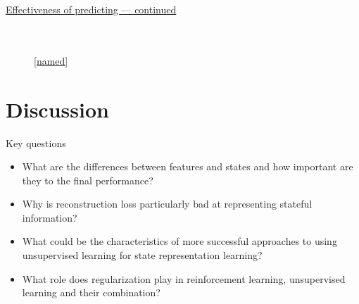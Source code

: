\documentclass{beamer}
\begin{document}
\begin{frame}[plain]
		\centering
		\underline{Effectiveness of predicting --- continued}
		\vspace{-1cm}
\begin{figure}[!t]
  \captionsetup[subfloat]{position=top,labelformat=empty}
  \centering
    \subfloat[]{  \resizebox{0.4\textwidth}{!}{}}
    \subfloat[]{  \resizebox{0.4\textwidth}{!}{}}\\
  \vspace{-1cm}
    \subfloat[]{  \resizebox{0.4\textwidth}{!}{}}
  \\
    \ref{named}
\end{figure}
\end{frame}


\section{Discussion}

\begin{frame}{Key questions}
		\begin{itemize}
		\item What are the differences between features and states 
				and how important are they to the final performance?
		\item Why is reconstruction loss particularly bad at representing
				stateful information?
		\item What could be the characteristics of more successful approaches
				to using unsupervised learning for state representation learning?
		\item What role does regularization play in reinforcement learning,
				unsupervised learning and their combination?
		\end{itemize}
\end{frame}
\end{document}
